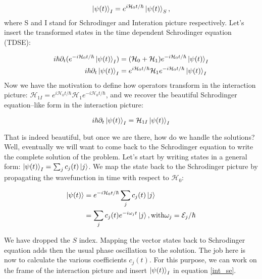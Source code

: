 \begin{equation}
    \ket{\psi(t)}_{I} = e^{i\mathcal{H}_{0}t/ \hbar} \ket{\psi(t)}_{S},
\end{equation}
where S and I stand for Schrodinger and Interation picture respectively. Let's insert the transformed states in the time dependent Schrodinger equation (TDSE):

\begin{equation}
    \begin{aligned}
    i \hbar \partial_{t} (e^{-i\mathcal{H}_{0}t/ \hbar} \ket{\psi(t)}_{I}) & = (\mathcal{H}_{0} + \mathcal{H}_{1}) e^{-i\mathcal{H}_{0}t/ \hbar} \ket{\psi(t)}_{I} \\
    i \hbar \partial_{t} \ket{\psi(t)}_{I} & = e^{i\mathcal{H}_{0}t/ \hbar} \mathcal{H}_{1} e^{-i\mathcal{H}_{0}t/ \hbar} \ket{\psi(t)}_{I}
    \end{aligned}
\end{equation}
Now we have the motivation to define how operators transform in the interaction picture: $\mathcal{H}_{1I} = e^{i\mathcal{H}_{0}t/ \hbar} \mathcal{H}_{1} e^{-i\mathcal{H}_{0}t/ \hbar}$, and we recover the beautiful Schrodinger equation--like form in the interaction picture:

\begin{equation} \label{int_se}
    i \hbar \partial_{t} \ket{\psi(t)}_{I} = \mathcal{H}_{1I}  \ket{\psi(t)}_{I}
\end{equation}

That is indeed beautiful, but once we are there, how do we handle the solutions? Well, eventually we will want to come back to the Schrodinger equation to write the complete solution of the problem. Let's start by writing states in a general form: $\ket{\psi(t)}_{I} = \sum _{j} c_{j}(t) \ket{j}$. We map the state back to the Schrodinger picture by propagating the wavefunction in time with respect to $\mathcal{H}_{0}$:

\begin{equation}
    \begin{aligned}
        \ket{\psi(t)} & = e^{-i \mathcal{H}_{0}t / \hbar} \sum _{j} c_{j}(t) \ket{j} \\
            & = \sum _{j} c_{j}(t) e^{-i \omega_{j} t} \ket{j}, \mathrm{with} \omega_{j} = \mathcal{E}_{j} / \hbar
    \end{aligned}
\end{equation}

We have dropped the $S$ index. Mapping the vector states back to Schrodinger equation adds then the usual phase oscillation to the solution. The job here is now to calculate the various coefficients $c_{j}(t)$. For this purpose, we can work on the frame of the interaction picture and insert $\ket{\psi(t)}_{I}$ in equation \ref{int_se}. 



